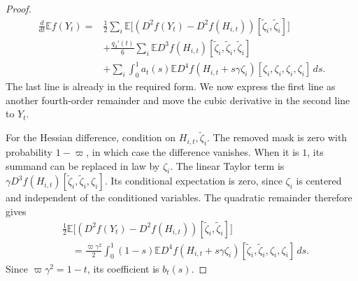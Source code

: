 \documentclass[11pt,letterpaper]{article}
\theoremstyle{remark}
\newcommand{\E}{\mathbb E}
\newcommand{\dd}{\,d}
\begin{document}
\begin{proof}
\begin{equation}
\begin{aligned}
 \frac{d}{dt}\E f(Y_t)
 ={}&\frac12\sum_i\E
       \bigl[(D^2f(Y_t)-D^2f(H_{i,t}))
             [\widetilde\zeta_i,\widetilde\zeta_i]\bigr]\\
 &+\frac{q_3'(t)}6\sum_i
       \E D^3f(H_{i,t})
              [\widetilde\zeta_i,\widetilde\zeta_i,
               \widetilde\zeta_i]\\
 &+\sum_i\int_0^1a_t(s)
       \E D^4f(H_{i,t}+s\gamma\zeta_i)
              [\zeta_i,\zeta_i,\zeta_i,\zeta_i]\dd s.
 \end{aligned}
 \label{appx-an:deleted-base-expansion}
\end{equation}
The last line is already in the required form. We now express
the first line as another fourth-order remainder and move the
cubic derivative in the second line to \(Y_t\).

For the Hessian difference, condition on
\(H_{i,t},\widetilde\zeta_i\). The removed mask is zero with
probability \(1-\varpi\), in which case the difference vanishes.
When it is \(1\), its summand can be replaced in law by \(\zeta_i\).
The linear Taylor term is
$\gamma D^3f(H_{i,t})[\widetilde\zeta_i,\widetilde\zeta_i,\zeta_i]$.
Its conditional expectation is zero, since $\zeta_i$ is centered
and independent of the conditioned variables. The quadratic
remainder therefore gives
\[
 \begin{aligned}
 &\frac12\E
    \bigl[(D^2f(Y_t)-D^2f(H_{i,t}))
                 [\widetilde\zeta_i,\widetilde\zeta_i]\bigr]\\
 &\quad=\frac{\varpi\gamma^2}{2}\int_0^1(1-s)
       \E D^4f(H_{i,t}+s\gamma\zeta_i)
           [\widetilde\zeta_i,\widetilde\zeta_i,
            \zeta_i,\zeta_i]\dd s.
 \end{aligned}
\]
Since \(\varpi\gamma^2=1-t\), its coefficient is \(b_t(s)\).


\end{proof}
\end{document}

